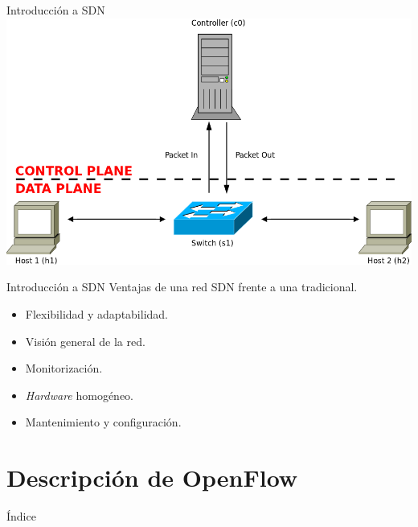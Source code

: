 \documentclass{beamer}
\begin{document}
\begin{frame}{Introducción a SDN}
    \includegraphics[scale=0.33]{SDN.png}
\end{frame}

\begin{frame}{Introducción a SDN}
    Ventajas de una red SDN frente a una tradicional.\vspace{10pt}
    \begin{itemize}
        \item Flexibilidad y adaptabilidad.
        \item Visión general de la red.
        \item Monitorización. 
        \item \textit{Hardware} homogéneo.
        \item Mantenimiento y configuración.
    \end{itemize}
\end{frame}

\section{Descripción de OpenFlow}
\begin{frame}{Índice}
    \begin{columns}[t]
        \begin{column}{1.7in}
            \tableofcontents[currentsection, hideallsubsections, sections={1-4}]
        \end{column}
        \begin{column}{1.7in}
            \tableofcontents[currentsection, hideallsubsections, sections={5-7}]
        \end{column}
    \end{columns}
\end{frame}
\end{document}
